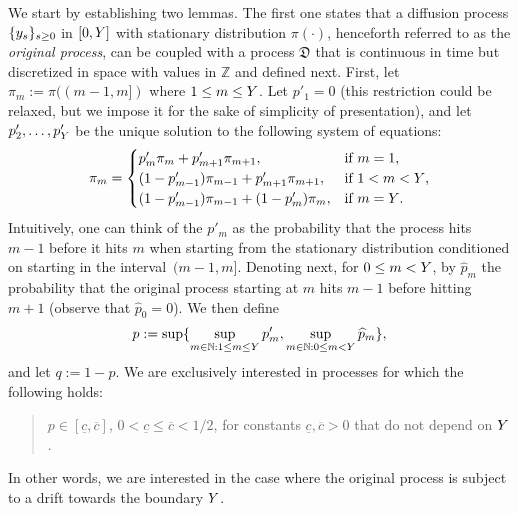 	
	We start by establishing two lemmas. The first one states that a diffusion process $\{y_s\}_{s\geq 0}$ in $[0,Y]$ with stationary distribution $\pi(\cdot)$,
    henceforth referred to as the \emph{original process}, can be coupled with a process $\mathfrak{D}$ that is continuous in time but discretized in space with values in $\mathbb{Z}$ and defined next.
    First, let $\pi_m:=\pi((m-1,m])$ where $1\le m\le Y$. 
    Let $p'_1=0$ (this restriction could be relaxed, but we impose it for the sake of simplicity of presentation), and let $p'_2,\ldots, p'_{Y}$ be the unique solution to the following system of equations:
    \begin{equation}\label{radial:def:pim}
    \pi_{m} = 
    \begin{cases} 
    p'_{m}\pi_{m}+p'_{m+1}\pi_{m+1}, & \text{if $m=1$,} \\    
    (1-p'_{m-1})\pi_{m-1}+p'_{m+1}\pi_{m+1}, & \text{if $1<m<Y$,} \\
    (1-p'_{m-1})\pi_{m-1}+(1-p'_{m})\pi_{m}, & \text{if $m=Y$.} 
    \end{cases}
    \end{equation}
    Intuitively, one can think of the $p'_m$ as the probability that the process
    hits $m-1$ before it hits $m$ when starting from the stationary distribution conditioned on starting in the interval~$(m-1,m]$. %
	Denoting next, for $0 \le m < Y$, by
	$\widehat{p}_m$ the probability that the original process starting at $m$ hits  $m-1$ before hitting $m+1$ (observe that $\widehat{p}_0=0$). %
	We then define
	$$
	p:=\sup\{\sup_{m\in \mathbb{N}: 1 \le m\le Y} p'_m, \sup_{m \in \mathbb{N}: 0 \le m < Y} \widehat{p}_m\},
	$$
	and let $q:=1-p$.
	 We are exclusively interested in processes for which the following holds:
	\begin{quote}
	    $p \in [\underline{c},\overline{c}]$, $0<\underline{c}\leq\overline{c}<1/2$, 
	    for constants $\underline{c},\overline{c}>0$ 
	    that do not depend on $Y$. 
	\end{quote}
	In other words, we are interested in the case
	where the original process is subject to a drift towards the boundary $Y$.
	
